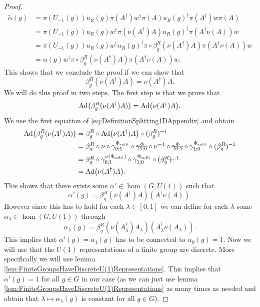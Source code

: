 \documentclass[12pt,a4paper,twoside]{article}
\numberwithin{equation}{section}
\begin{document}
\begin{proof}
\begin{align}
		\tilde{\alpha}(g)&=\pi(U_{-1}(g))u_R(g)\pi(A^\dagger)w^\dagger\pi(A)u_R(g)^\dagger\pi(A^\dagger)w\pi(A)\\
		&=\pi(U_{-1}(g))u_R(g)w^\dagger \pi(\nu(A^\dagger)A)u_R(g)^\dagger\pi(A^\dagger\nu(A))w\\
		&=\pi(U_{-1}(g))u_R(g)w^\dagger u_R(g)^\dagger \pi\circ\beta_g^R(\nu(A^\dagger)A)\pi(A^\dagger\nu(A))w\\
		&=\alpha(g)w^\dagger \pi\circ\beta_g^R(\nu(A^\dagger)A)\pi(A^\dagger\nu(A))w.
	\end{align}
	This shows that we conclude the proof if we can show that
	\begin{equation}
		\beta_g^R(\nu(A^\dagger)A)=\nu(A^\dagger)A.
	\end{equation}
	We will do this proof in two steps. The first step is that we prove that
	\begin{equation}\label{eq:ProofThat1DTranslationIndexIsInvariantUnderLGAAdjoints}
		\Ad{\beta_g^R(\nu(A^\dagger)A)}=\Ad{\nu(A^\dagger)A}.
	\end{equation}
	We use the first equation of \eqref{eq:DefinitionSplitting1DAppendix} and obtain
	\begin{align}
		\Ad{\beta_g^R(\nu(A^\dagger)A)}&=\beta_g^R\circ\Ad{\nu(A^\dagger)A}\circ(\beta_g^R)^{-1}\\
		&=\beta_g^R\circ\nu\circ\gamma^{\Phi_{\text{split}}}_{0;1}\circ\stkout{\gamma^{\Phi}_{1;0}}\circ\nu^{-1}\circ\stkout{\gamma^{\Phi}_{0;1}}\circ\gamma^{\Phi_{\text{split}}}_{1;0}\circ(\beta_g^R)^{-1}\\
		&=\stkout{\beta_g^R}\circ\gamma^{\nu(\Phi_{\text{split}})}_{0;1}\circ\gamma^{\Phi_{\text{split}}}_{1;0}\circ\stkout{(\beta_g^R)^{-1}}\\
		&=\Ad{\nu(A^\dagger)A}.
	\end{align}
	This shows that there exists some $\alpha'\in\hom(G,U(1))$ such that
	\begin{equation}
		\alpha'(g)=\beta_g^R(\nu(A^\dagger)A)(A^\dagger \nu(A)).
	\end{equation}
	However since this has to hold for each $\lambda\in[0,1]$ we can define for each $\lambda$ some $\alpha_\lambda\in\hom(G,U(1))$ through
	\begin{equation}
		\alpha_\lambda(g)=\beta_g^R(\nu(A^\dagger_\lambda)A_\lambda)(A^\dagger_\lambda \nu(A_\lambda)).
	\end{equation}
	This implies that $\alpha'(g)=\alpha_1(g)$ has to be connected to $\alpha_0(g)=1$. Now we will use that the $U(1)$ representations of a finite group are discrete. More specifically we will use lemma \ref{lem:FiniteGroupsHaveDiscreteU(1)Representations}. This implies that $\alpha'(g)=1$ for all $g\in G$ in our case (as we can just use lemma \ref{lem:FiniteGroupsHaveDiscreteU(1)Representations} as many times as needed and obtain that $\lambda\mapsto\alpha_\lambda(g)$ is constant for all $g\in G$).
\end{proof}
\end{document}
